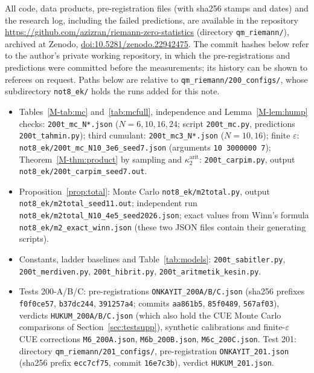 \documentclass[12pt]{amsart}
\theoremstyle{remark}
\newcommand{\eps}{\varepsilon}
\newcommand{\1}{\mathbf{1}}
\begin{document}
All code, data products, pre-registration files (with sha256 stamps and
dates) and the research log, including the failed predictions, are
available in the repository
\url{https://github.com/azizran/riemann-zero-statistics} (directory
\texttt{qm\_riemann/}), archived at Zenodo,
\href{https://doi.org/10.5281/zenodo.22942475}{doi:10.5281/zenodo.22942475}.
The commit hashes below refer to the author's private working repository,
in which the pre-registrations and predictions were committed before the
measurements; its history can be shown to referees on request. Paths below are relative to \nolinkurl{qm_riemann/200_configs/}, whose
subdirectory \texttt{not8\_ek/} holds the runs added for this note.
\begin{itemize}
\item Tables~\ref{M-tab:mc} and~\ref{tab:mcfull}, independence and
Lemma~\ref{M-lem:hump} checks: \nolinkurl{200t_mc_N*.json} ($N=6,10,16,24$;
script \nolinkurl{200t_mc.py}, predictions \nolinkurl{200t_tahmin.py});
third cumulant: \nolinkurl{200t_mc3_N*.json} ($N=10,16$); finite $\eps$:
\nolinkurl{not8_ek/200t_mc_N10_3e6_seed7.json}
(arguments \texttt{10 3000000 7}); Theorem~\ref{M-thm:product} by
sampling and $\kappa_2^{\mathrm{arit}}$:
\nolinkurl{200t_carpim.py}, output
\nolinkurl{not8_ek/200t_carpim_seed7.out}.
\item Proposition~\ref{prop:total}: Monte Carlo
\nolinkurl{not8_ek/m2total.py}, output
\nolinkurl{not8_ek/m2total_seed11.out}; independent run
\nolinkurl{not8_ek/m2total_N10_4e5_seed2026.json}; exact values
from Winn's formula \nolinkurl{not8_ek/m2_exact_winn.json} (these
two JSON files contain their generating scripts).
\item Constants, ladder baselines and Table~\ref{tab:models}:
\nolinkurl{200t_sabitler.py}, \nolinkurl{200t_merdiven.py},
\nolinkurl{200t_hibrit.py}, \nolinkurl{200t_aritmetik_kesin.py}.
\item Tests 200-A/B/C: pre-registrations
\nolinkurl{ONKAYIT_200A/B/C.json} (sha256 prefixes
\texttt{f0f0ce57}, \texttt{b37dc244}, \texttt{391257a4}; commits
\texttt{aa861b5}, \texttt{85f0489}, \texttt{567af03}), verdicts
\nolinkurl{HUKUM_200A/B/C.json} (which also hold the CUE Monte Carlo
comparisons of Section~\ref{sec:testsupp}), synthetic calibrations and
finite-$\eps$ CUE corrections \nolinkurl{M6_200A.json},
\nolinkurl{M6b_200B.json}, \nolinkurl{M6c_200C.json}. Test 201: directory
\nolinkurl{qm_riemann/201_configs/}, pre-registration
\nolinkurl{ONKAYIT_201.json} (sha256 prefix \texttt{ecc7cf75}, commit
\texttt{16e7c3b}), verdict \nolinkurl{HUKUM_201.json}.

\end{itemize}
\end{document}
